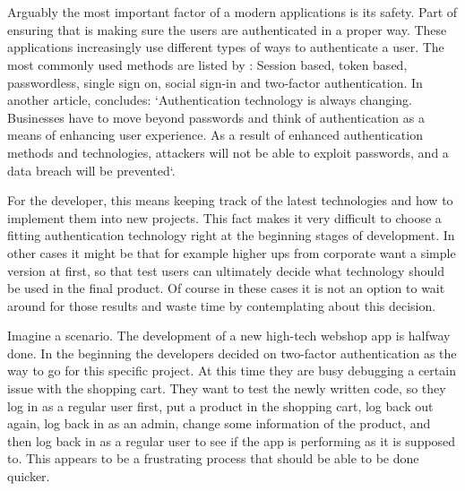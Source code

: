 
\chapter{}%
\label{ch:inleiding}

Arguably the most important factor of a modern applications is its safety. Part of ensuring that is making sure the users are authenticated in a proper way. These applications increasingly use different types of ways to authenticate a user. The most commonly used methods are listed by \textcite{Hassan2017}: Session based, token based, passwordless, single sign on, social sign-in and two-factor authentication. In another article, \textcite{Maayan} concludes: `Authentication technology is always changing. Businesses have to move beyond passwords and think of authentication as a means of enhancing user experience. As a result of enhanced authentication methods and technologies, attackers will not be able to exploit passwords, and a data breach will be prevented`.

For the developer, this means keeping track of the latest technologies and how to implement them into new projects. This fact makes it very difficult to choose a fitting authentication technology right at the beginning stages of development. In other cases it might be that for example higher ups from corporate want a simple version at first, so that test users can ultimately decide what technology should be used in the final product. Of course in these cases it is not an option to wait around for those results and waste time by contemplating about this decision.

Imagine a scenario. The development of a new high-tech webshop app is halfway done. In the beginning the developers decided on two-factor authentication as the way to go for this specific project. At this time they are busy debugging a certain issue with the shopping cart. They want to test the newly written code, so they log in as a regular user first, put a product in the shopping cart, log back out again, log back in as an admin, change some information of the product, and then log back in as a regular user to see if the app is performing as it is supposed to. This appears to be a frustrating process that should be able to be done quicker.

